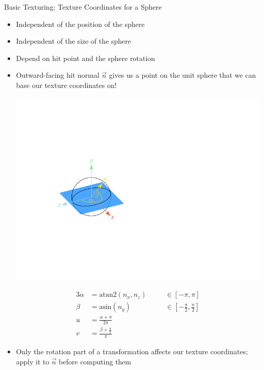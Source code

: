 \documentclass[utf8,stillsansserifmath,fleqn,t]{beamer}
\begin{document}
\begin{frame}[label=basic-tex-2]
\frametitle{\insertsection}
Basic Texturing: Texture Coordinates for a Sphere
\begin{itemize}
\item Independent of the position of the sphere
\item Independent of the size of the sphere
\item Depend on hit point and the sphere rotation
\item Outward-facing hit normal $\vec{n}$ gives us a 
point on the unit sphere that we can base our texture coordinates on!\\
\begin{minipage}{.35\textwidth}
\centerline{\includegraphics[width=.8\textwidth]{./fig/sphere-texcoords.pdf}}
\end{minipage}\hfill
\begin{minipage}{.43\textwidth}
\begin{alignat*}{3}
\alpha &= \text{atan2}(n_x, n_z) \quad && \in [-\pi,\pi]\\
\beta  &= \text{asin}(n_y)             && \in [-\frac{\pi}{2},\frac{\pi}{2}]\\
u &= \frac{\alpha + \pi}{2\pi} && \\
v &= \frac{\beta + \frac{\pi}{2}}{\pi} &&
\end{alignat*}
\end{minipage}
\item Only the rotation part of a transformation affects our texture
coordinates; apply it to $\vec{n}$ before computing them
\end{itemize}
\end{frame}
\end{document}
